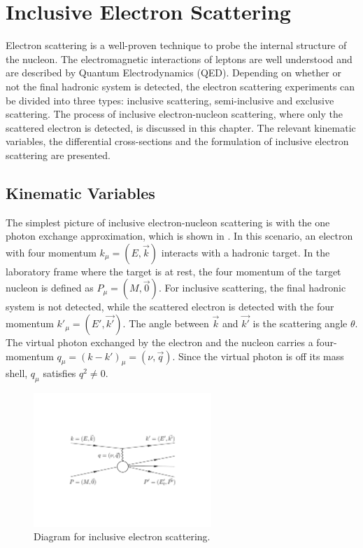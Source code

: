 
\chapter{Inclusive Electron Scattering}
\label{C2}

Electron scattering is a well-proven technique to probe the internal structure of the nucleon. The electromagnetic interactions of leptons are well understood and are described by Quantum Electrodynamics (QED). Depending on whether or not the final hadronic system is detected, the electron scattering experiments can be divided into three types: inclusive scattering, semi-inclusive and exclusive scattering. The process of inclusive electron-nucleon scattering, where only the scattered electron is detected, is discussed in this chapter. The relevant kinematic variables, the differential cross-sections and the formulation of inclusive electron scattering are presented.

\section{Kinematic Variables}
\label{C2S1}

The simplest picture of inclusive electron-nucleon scattering is with the one photon exchange approximation, which is shown in . In this scenario, an electron with four momentum $k_\mu=(E,\vec{k})$ interacts with a hadronic target. In the laboratory frame where the target is at rest, the four momentum of the target nucleon is defined as $P_\mu=(M,\vec{0})$. For inclusive scattering, the final hadronic system is not detected, while the scattered electron is detected with the four momentum $k'_\mu=(E',\vec{k'})$. The angle between $\vec{k}$ and $\vec{k'}$ is the scattering angle $\theta$. The virtual photon exchanged by the electron and the nucleon carries a four-momentum $q_\mu=(k-k')_\mu=(\nu,\vec{q})$. Since the virtual photon is off its mass shell, $q_\mu$ satisfies $q^2\ne 0$.

\begin{figure}[tb!]
  \centering
  \includegraphics[width=0.6\textwidth]{figs/inclusive-scattering.pdf}
  \caption[Diagram for inclusive electron scattering.]{Diagram for inclusive electron scattering. \label{C2S1F1}}
\end{figure}

